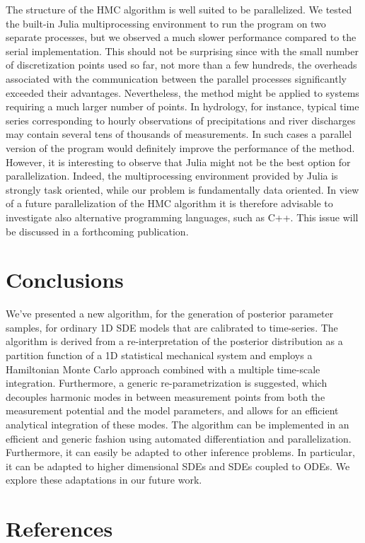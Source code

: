 \documentclass[12pt,a4paper,final]{iopart}
\begin{document}
The structure of the HMC algorithm is well suited to be parallelized. We tested the built-in Julia multiprocessing environment to run the program on two separate processes, but we observed a much slower performance compared to the serial implementation. This should not be surprising since with the small number of discretization points used so far, not more than a few hundreds, the overheads associated with the communication between the parallel processes significantly exceeded their advantages. Nevertheless, the method might be applied to systems requiring a much larger number of points. In hydrology, for instance, typical time series corresponding to hourly observations of precipitations and river discharges may contain several tens of thousands of measurements. In such cases a parallel version of the program would definitely improve the performance of the method. However, it is interesting to observe that Julia might not be the best option for parallelization. Indeed, the multiprocessing environment provided by Julia is strongly task oriented, while our problem is fundamentally data oriented. In view of a future parallelization of the HMC algorithm it is therefore advisable to investigate also alternative programming languages, such as C++. This issue will be discussed in a forthcoming publication.


\section{Conclusions}

We've presented a new algorithm, for the generation of posterior parameter samples, for ordinary 1D SDE models that are calibrated to time-series.
The algorithm is derived from a re-interpretation of the posterior distribution as a partition function of a 1D statistical mechanical system and employs a Hamiltonian Monte Carlo approach combined with a multiple time-scale integration.
Furthermore, a generic re-parametrization is suggested, which decouples harmonic modes in between measurement points from both the measurement potential and the model parameters, and allows for an efficient analytical integration of these modes.
The algorithm can be implemented in an efficient and generic fashion using automated differentiation and parallelization.
Furthermore, it can easily be adapted to other inference problems.
In particular, it can be adapted to higher dimensional SDEs and SDEs coupled to ODEs.
We explore these adaptations in our future work.

\section*{References}


\end{document}
